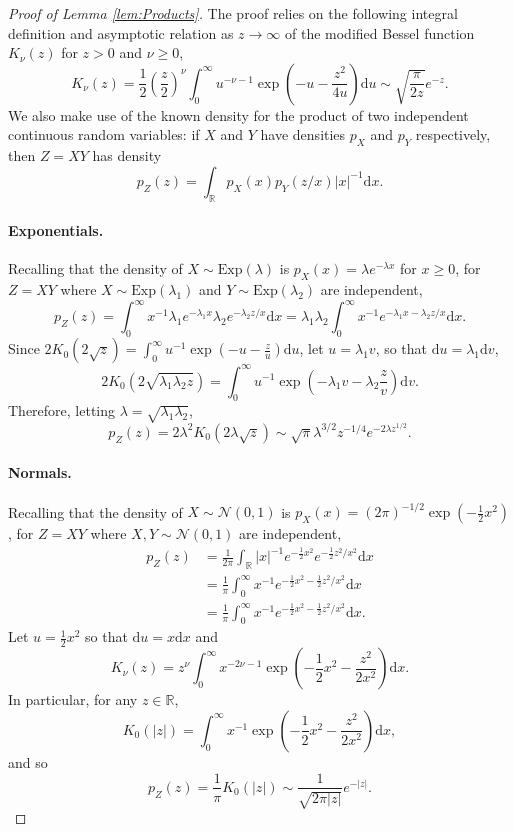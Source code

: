 \documentclass{article}
\theoremstyle{definition}
\newcommand{\dd}{\mathrm{d}}
\begin{document}
\begin{proof}[Proof of Lemma \ref{lem:Products}]
The proof relies on the following integral definition \cite[pg. 183]{watson1995treatise} and asymptotic relation as $z \to \infty$ \cite[pg. 202]{watson1995treatise} of the modified Bessel function $K_\nu(z)$ for $z > 0$ and $\nu \geq 0$,
\begin{equation}
\label{eq:BesselInt}
K_\nu(z) = \frac12 \left(\frac{z}{2}\right)^\nu \int_0^\infty u^{-\nu-1}\exp\left(-u - \frac{z^2}{4u}\right) \dd u \sim \sqrt{\frac{\pi}{2z}}e^{-z}. 
\end{equation}
We also make use of the known density for the product of two independent continuous random variables: if $X$ and $Y$ have densities $p_X$ and $p_Y$ respectively, then $Z = XY$ has density
\[
p_Z(z) = \int_\mathbb{R} p_X(x) p_Y(z/x) |x|^{-1} \dd x.
\]
\paragraph{Exponentials.} Recalling that the density of $X \sim \mathrm{Exp}(\lambda)$ is $p_X(x) = \lambda e^{-\lambda x}$ for $x \geq 0$, for $Z = XY$ where $X \sim \mathrm{Exp}(\lambda_1)$ and $Y \sim \mathrm{Exp}(\lambda_2)$ are independent,
\[
p_Z(z) = \int_{0}^{\infty}x^{-1}\lambda_{1}e^{-\lambda_{1}x}\lambda_{2}e^{-\lambda_{2}z/x}\dd x = \lambda_{1}\lambda_{2}\int_{0}^{\infty}x^{-1}e^{-\lambda_{1}x-\lambda_{2}z/x}\dd x.
\]
Since $2K_{0}(2\sqrt{z})=\int_{0}^{\infty}u^{-1}\exp(-u-\frac{z}{u})\dd u$, let $u = \lambda_1 v$, so that $\dd u = \lambda_1 \dd v$,
\[
2K_{0}(2\sqrt{\lambda_{1}\lambda_{2}z})=\int_{0}^{\infty}u^{-1}\exp\left(-\lambda_{1}v-\lambda_{2}\frac{z}{v}\right)\dd v.
\]
Therefore, letting $\lambda = \sqrt{\lambda_1\lambda_2}$, 
\[
p_Z(z) = 2\lambda^2 K_0(2\lambda\sqrt{z}) \sim \sqrt{\pi} \lambda^{3/2} z^{-1/4} e^{-2\lambda z^{1/2}}.
\]
\paragraph{Normals.} Recalling that the density of $X \sim \mathcal{N}(0,1)$ is $p_X(x) = (2\pi)^{-1/2} \exp(-\frac12 x^2)$, for $Z = XY$ where $X,Y \sim \mathcal{N}(0,1)$ are independent, 
\begin{align*}
p_Z(z) &= \frac{1}{2\pi}\int_{\mathbb{R}}\left|x\right|^{-1}e^{-\frac{1}{2}x^{2}}e^{-\frac{1}{2}z^{2}/x^{2}}\dd x\\
&=\frac{1}{\pi}\int_{0}^{\infty}x^{-1}e^{-\frac{1}{2}x^{2}-\frac{1}{2}z^{2}/x^{2}}\dd x\\
&=\frac{1}{\pi}\int_{0}^{\infty}x^{-1}e^{-\frac{1}{2}x^{2}-\frac{1}{2}z^{2}/x^{2}}\dd x.
\end{align*}
Let $u=\frac{1}{2}x^{2}$ so that $\dd u=x \dd x$ and
\[
K_{\nu}(z)=z^{\nu}\int_{0}^{\infty}x^{-2\nu-1}\exp\left(-\frac{1}{2}x^{2}-\frac{z^{2}}{2x^{2}}\right)\dd x.
\]
In particular, for any $z \in \mathbb{R}$,
\begin{equation}
\label{eq:BesselGauss}
K_{0}(|z|)=\int_{0}^{\infty}x^{-1}\exp\left(-\frac{1}{2}x^{2}-\frac{z^{2}}{2x^{2}}\right)\dd x,
\end{equation}
and so
\[
p_Z(z) = \frac{1}{\pi} K_0(|z|) \sim \frac{1}{\sqrt{2\pi|z|}} e^{-|z|}.
\]

\end{proof}
\end{document}
